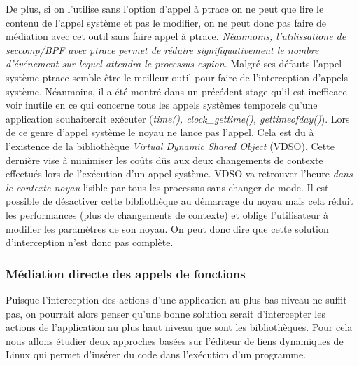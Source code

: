 De plus, si on l'utilise sans l'option d'appel à ptrace on ne peut que lire le
contenu de l'appel système et pas le modifier, on ne peut donc pas faire de
médiation avec cet outil sans faire appel à ptrace. \textit{Néanmoins,
  l'utilissatione de seccomp/BPF avec ptrace permet de réduire
  signifiquativement le nombre d'événement sur lequel attendra le processus
  espion.}
\newline
Malgré ses défauts l'appel système ptrace semble être le meilleur outil pour
faire de l'interception d'appels système. Néanmoins, il a été montré dans un
précédent stage \citet{INTERCEPTION:MARION} qu'il est
inefficace voir inutile en ce qui concerne tous les appels systèmes temporels
qu'une application souhaiterait exécuter (\textit{time(), clock\_gettime(),
  gettimeofday()}). Lors de ce genre d'appel système le noyau ne lance pas
l'appel. Cela est du à l'existence de la bibliothèque \textit{Virtual Dynamic
  Shared Object} (VDSO). Cette dernière vise à minimiser les coûts dûs aux deux
changements de contexte effectués lors de l'exécution d'un appel système. VDSO
va retrouver l'heure \textit{{\color{red}dans le contexte noyau}} lisible par tous les
processus sans changer de mode. Il est possible de désactiver cette bibliothèque
au démarrage du noyau mais cela réduit les performances (plus de changements de
contexte) et oblige l'utilisateur à modifier les paramètres de son noyau. On
peut donc dire que cette solution d'interception n'est donc pas complète.


\subsubsection{Médiation directe des appels de fonctions}

Puisque l'interception des actions d'une application au plus bas niveau ne
suffit pas, on pourrait alors penser qu'une bonne solution serait d'intercepter
les actions de l'application au plus haut niveau que sont les
bibliothèques. Pour cela nous allons étudier deux approches basées sur l'éditeur
de liens dynamiques de Linux qui permet d'insérer du code dans l'exécution
d'un programme.

